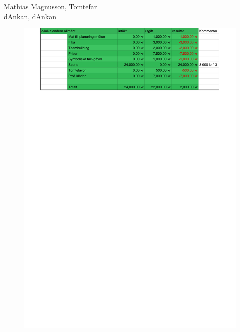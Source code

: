 \documentclass[a4paper]{article}
\begin{document}
\vspace{1cm}

Mathias Magnusson, Tomtefar \\
dAnkan, dAnkan

\printbibliography


\begin{figure}
    \includegraphics[width=1\textwidth]{./budget.pdf}
    \label{fig:budget}
\end{figure}
\end{document}
